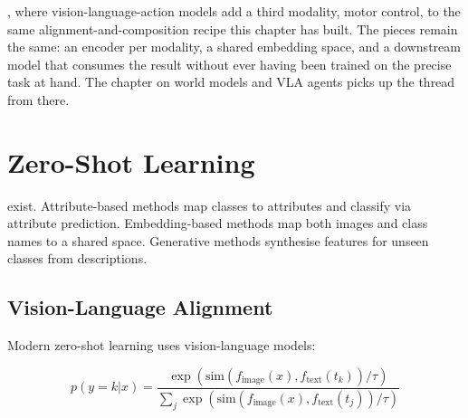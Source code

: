 
, where vision-language-action models add a third modality, motor control, to the same alignment-and-composition recipe this chapter has built. The pieces remain the same: an encoder per modality, a shared embedding space, and a downstream model that consumes the result without ever having been trained on the precise task at hand. The chapter on world models and VLA agents picks up the thread from there.

\vspace{2.5em}




\section{Zero-Shot Learning}


 exist. Attribute-based methods map classes to attributes and classify via attribute prediction. Embedding-based methods map both images and class names to a shared space. Generative methods synthesise features for unseen classes from descriptions.

\subsection{Vision-Language Alignment}

Modern zero-shot learning uses vision-language models:

\begin{equation}
    p(y = k | x) = \frac{\exp(\text{sim}(f_{\text{image}}(x), f_{\text{text}}(t_k)) / \tau)}{\sum_j \exp(\text{sim}(f_{\text{image}}(x), f_{\text{text}}(t_j)) / \tau)}
\end{equation}

